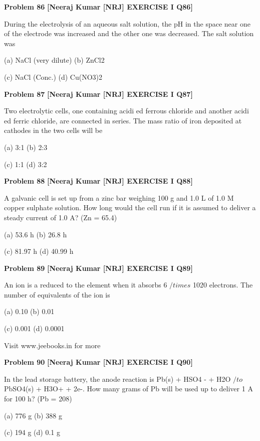 \begin{problembox}
\textbf{Problem 86} \hfill \textbf{[Neeraj Kumar [NRJ] EXERCISE I Q86]}
\label{q:ext-nrj_all_questions-86}

During the electrolysis of an aqueous salt 
solution, the pH in the space near one of the 
electrode was increased and the other one was 
decreased. The salt solution was
 
 (a) NaCl (very dilute) 
(b) ZnCl2
 
 (c) NaCl (Conc.) 
(d) Cu(NO3)2
\end{problembox}

\begin{problembox}
\textbf{Problem 87} \hfill \textbf{[Neeraj Kumar [NRJ] EXERCISE I Q87]}
\label{q:ext-nrj_all_questions-87}

Two electrolytic cells, one containing acidi  ed 
ferrous chloride and another acidi  ed ferric 
chloride, are connected in series. The mass ratio 
of iron deposited at cathodes in the two cells 
will be
 
 (a) 3:1 
(b) 2:3
 
 (c) 1:1 
(d) 3:2
\end{problembox}

\begin{problembox}
\textbf{Problem 88} \hfill \textbf{[Neeraj Kumar [NRJ] EXERCISE I Q88]}
\label{q:ext-nrj_all_questions-88}

A galvanic cell is set up from a zinc bar weighing 
100 g and 1.0 L of 1.0 M copper sulphate solution. 
How long would the cell run if it is assumed to 
deliver a steady current of 1.0 A? (Zn = 65.4)
 
 (a) 53.6 h 
(b) 26.8 h
 
 (c) 81.97 h 
(d) 40.99 h
\end{problembox}

\begin{problembox}
\textbf{Problem 89} \hfill \textbf{[Neeraj Kumar [NRJ] EXERCISE I Q89]}
\label{q:ext-nrj_all_questions-89}

An ion is a reduced to the element when it absorbs 
6 $/times$ 1020 electrons. The number of equivalents of 
the ion is
 
 (a) 0.10 
(b) 0.01
 
 (c) 0.001 
(d) 0.0001
 
 
Visit www.jeebooks.in for more
\end{problembox}

\begin{problembox}
\textbf{Problem 90} \hfill \textbf{[Neeraj Kumar [NRJ] EXERCISE I Q90]}
\label{q:ext-nrj_all_questions-90}

In the lead storage battery, the anode  reaction is 
Pb(s) + HSO4
- + H2O $/to$ PbSO4(s) + H3O+ + 2e-. 
How many grams of Pb will be used up to deliver 
1 A for 100 h? (Pb = 208)
 
 (a) 776 g 
(b) 388 g
 
 (c) 194 g 
(d) 0.1 g
\end{problembox}

